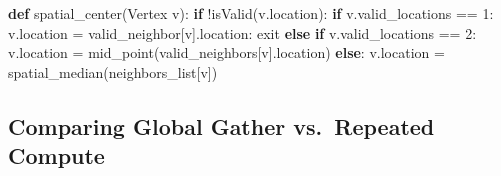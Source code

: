 \documentclass[10pt,oneside]{memoir}
\newenvironment{Shaded}{}{}
\newcommand{\ControlFlowTok}[1]{\textcolor[rgb]{0.00,0.44,0.13}{\textbf{#1}}}
\newcommand{\DecValTok}[1]{\textcolor[rgb]{0.25,0.63,0.44}{#1}}
\newcommand{\KeywordTok}[1]{\textcolor[rgb]{0.00,0.44,0.13}{\textbf{#1}}}
\newcommand{\NormalTok}[1]{#1}
\newcommand{\OperatorTok}[1]{\textcolor[rgb]{0.40,0.40,0.40}{#1}}
\begin{document}
\begin{Shaded}
\begin{Highlighting}[]
\KeywordTok{def}\NormalTok{ spatial_center(Vertex v):}
    \ControlFlowTok{if} \OperatorTok{!}\NormalTok{isValid(v.location):}
        \ControlFlowTok{if}\NormalTok{ v.valid_locations }\OperatorTok{==} \DecValTok{1}\NormalTok{:}
\NormalTok{            v.location }\OperatorTok{=}\NormalTok{ valid_neighbor[v].location:}
\NormalTok{            exit}
        \ControlFlowTok{else} \ControlFlowTok{if}\NormalTok{ v.valid_locations }\OperatorTok{==} \DecValTok{2}\NormalTok{:}
\NormalTok{            v.location }\OperatorTok{=}\NormalTok{ mid_point(valid_neighbors[v].location)}
        \ControlFlowTok{else}\NormalTok{:}
\NormalTok{            v.location }\OperatorTok{=}\NormalTok{ spatial_median(neighbors_list[v])}
\end{Highlighting}
\end{Shaded}

\hypertarget{comparing-global-gather-vs.repeated-compute}{%
\subsection{Comparing Global Gather vs.~Repeated
Compute}\label{comparing-global-gather-vs.repeated-compute}}
\end{document}
